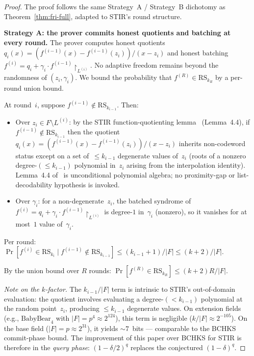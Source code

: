 \documentclass[11pt]{article}
\newcommand{\RS}{\mathrm{RS}}
\begin{document}
\begin{proof}
The proof follows the same Strategy~A / Strategy~B dichotomy as Theorem~\ref{thm:fri-full}, adapted to STIR's round structure.

\textbf{Strategy A: the prover commits honest quotients and batching at every round.} The prover computes honest quotients $q_i(x) = (f^{(i-1)}(x) - f^{(i-1)}(z_i))/(x-z_i)$ and honest batching $f^{(i)} = q_i + \gamma_i \cdot f^{(i-1)}\!\!\restriction_{L^{(i)}}$. No adaptive freedom remains beyond the randomness of $(z_i, \gamma_i)$. We bound the probability that $f^{(R)} \in \RS_{k_R}$ by a per-round union bound.

At round~$i$, suppose $f^{(i-1)} \notin \RS_{k_{i-1}}$. Then:
\begin{itemize}[nosep]
\item Over $z_i \in F \setminus L^{(i)}$: by the STIR function-quotienting lemma~\cite{STIR} (Lemma~4.4), if $f^{(i-1)} \notin \RS_{k_{i-1}}$ then the quotient $q_i(x) = (f^{(i-1)}(x) - f^{(i-1)}(z_i))/(x - z_i)$ inherits non-codeword status except on a set of~$\leq k_{i-1}$ degenerate values of~$z_i$ (roots of a nonzero degree-$(\leq k_{i-1})$ polynomial in~$z_i$ arising from the interpolation identity).  Lemma~4.4 of~\cite{STIR} is unconditional polynomial algebra; no proximity-gap or list-decodability hypothesis is invoked.
\item Over $\gamma_i$: for a non-degenerate~$z_i$, the batched syndrome of $f^{(i)} = q_i + \gamma_i \cdot f^{(i-1)}\!\!\restriction_{L^{(i)}}$ is degree-$1$ in~$\gamma_i$ (nonzero), so it vanishes for at most~$1$ value of~$\gamma_i$.
\end{itemize}
Per round: $\Pr[f^{(i)} \in \RS_{k_i} \mid f^{(i-1)} \notin \RS_{k_{i-1}}] \leq (k_{i-1} + 1)/|F| \leq (k + 2)/|F|$.

By the union bound over $R$ rounds: $\Pr[f^{(R)} \in \RS_{k_R}] \leq (k+2)R/|F|$.

\emph{Note on the $k$-factor.} The $k_{i-1}/|F|$ term is intrinsic to STIR's out-of-domain evaluation: the quotient involves evaluating a degree-$({<}k_{i-1})$ polynomial at the random point~$z_i$, producing $\leq k_{i-1}$ degenerate values. On extension fields (e.g., $\mathrm{BabyBear}_4$ with $|F| = p^4 \approx 2^{124}$), this term is negligible ($k/|F| \approx 2^{-105}$). On the base field ($|F| = p \approx 2^{31}$), it yields ${\sim} 7$~bits --- comparable to the BCHKS commit-phase bound. The improvement of this paper over BCHKS for STIR is therefore in the \emph{query phase}: $(1-\delta/2)^q$ replaces the conjectured $(1-\delta)^q$.


\end{proof}
\end{document}
